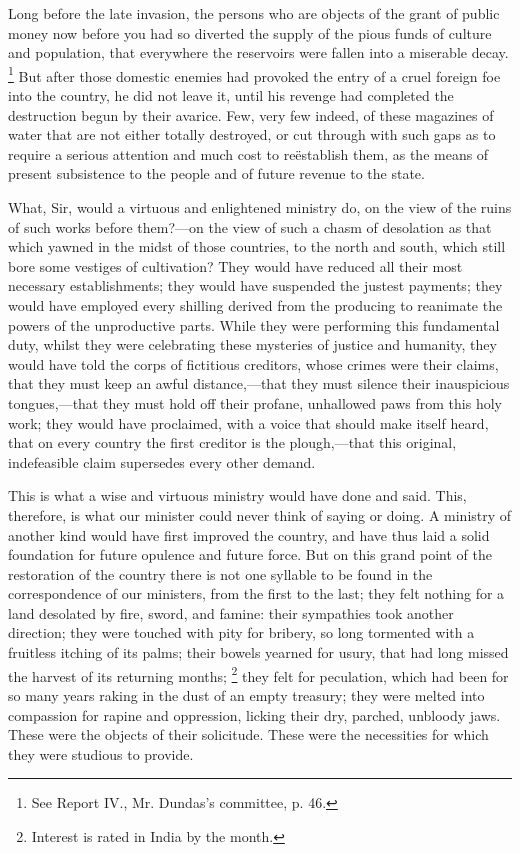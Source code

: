 Long before the late invasion, the persons who are objects of the grant of public money now before you had so diverted the supply of the pious funds of culture and population, that everywhere the reservoirs were fallen into a miserable decay.
\footnote{ See Report IV., Mr. Dundas's committee, p. 46.}
 But after those domestic enemies had provoked the entry of a cruel foreign foe into the country, he did not leave it, until his revenge had completed the destruction begun by their avarice. Few, very few indeed, of these magazines of water that are not either totally destroyed, or cut through with such gaps as to require a serious attention and much cost to reëstablish them, as the means of present subsistence to the people and of future revenue to the state.

What, Sir, would a virtuous and enlightened ministry do, on the view of the ruins of such works before them?—on the view of such a chasm of desolation as that which yawned in the midst of those countries, to the north and south, which still bore some vestiges of cultivation? They would have reduced all their most necessary establishments; they would have suspended the justest payments; they would have employed every shilling derived from the producing to reanimate the powers of the unproductive parts. While they were performing this fundamental duty, whilst they were celebrating these mysteries of justice and humanity, they would have told the corps of fictitious creditors, whose crimes were their claims, that they must keep an awful distance,—that they must silence their inauspicious tongues,—that they must hold off their profane, unhallowed paws from this holy work; they would have proclaimed, with a voice that should make itself heard, that on every country the first creditor is the plough,—that this original, indefeasible claim supersedes every other demand.

This is what a wise and virtuous ministry would have done and said. This, therefore, is what our minister could never think of saying or doing. A ministry of another kind would have first improved the country, and have thus laid a solid foundation for future opulence and future force. But on this grand point of the restoration of the country there is not one syllable to be found in the correspondence of our ministers, from the first to the last; they felt nothing for a land desolated by fire, sword, and famine: their sympathies took another direction; they were touched with pity for bribery, so long tormented with a fruitless itching of its palms; their bowels yearned for usury, that had long missed the harvest of its returning months;
\footnote{ Interest is rated in India by the month.}
 they felt for peculation, which had been for so many years raking in the dust of an empty treasury; they were melted into compassion for rapine and oppression, licking their dry, parched, unbloody jaws. These were the objects of their solicitude. These were the necessities for which they were studious to provide.

